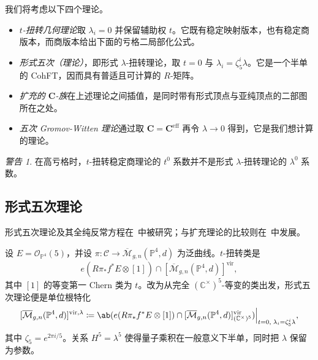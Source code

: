 \documentclass{amsart}
\theoremstyle{definition}
\theoremstyle{remark}
\newtheorem{warn}[thm]{警告}
\theoremstyle{plain}
\theoremstyle{definition}
\theoremstyle{remark}
\newcommand{\C}{\mathbb{C}}
\renewcommand{\P}{\mathbb{P}}
\newcommand{\Mbar}{\overline{\mathcal{M}}}
\newcommand{\mc}[1]{\mathcal{#1}}
\newcommand{\mbf}[1]{\mathbf{#1}}
\newcommand{\mr}[1]{\mathrm{#1}}
\newcommand{\1}{\mathbf{1}}
\newcommand{\2}{\mathbf{2}}
\newcommand{\3}{\mathbf{3}}
\newcommand{\vir}{\mr{vir}}
\begin{document}
我们将考虑以下四个理论。
\begin{itemize}
    \item \textit{\(t\)-扭转几何理论}取 \(\lambda_i = 0\) 并保留辅助权 \(t\)。它既有稳定映射版本，也有稳定商版本，而商版本给出下面的亏格二局部化公式。
    \item \textit{形式五次（理论）}，即形式 \(\lambda\)-扭转理论，取 \(t = 0\) 与 \(\lambda_i = \zeta_5^i \lambda\)。它是一个半单的 CohFT，因而具有普适且可计算的 \(R\)-矩阵。
    \item \textit{扩充的 \(\mbf{C}\)-族}在上述理论之间插值，是同时带有形式顶点与亚纯顶点的二部图所在之处。
    \item \textit{五次 Gromov-Witten 理论}通过取 \(\mbf{C} = \mbf{C}^{\mr{eff}}\) 再令 \(\lambda \to 0\) 得到，它是我们想计算的理论。
\end{itemize}

\begin{warn}
    在高亏格时，\(t\)-扭转稳定商理论的 \(t^0\) 系数并不是形式 \(\lambda\)-扭转理论的 \(\lambda^0\) 系数。
\end{warn}

\subsection{形式五次理论}%
\label{sub:The formal quintic}

形式五次理论及其全纯反常方程在~\cite{LhoPandharipande2019}中被研究；与扩充理论的比较则在~\cite{GJRstructure}中发展。

设 \(E = \mc{O}_{\P^4}(5)\)，并设 \(\pi \colon \mc{C} \to \Mbar_{g,n}(\P^4,d)\) 为泛曲线。\(t\)-扭转类是
\[ e(R\pi_* f^* E \otimes [1]) \cap [\Mbar_{g,n}(\P^4,d)]^{\vir}, \]
其中 \([1]\) 的等变第一 Chern 类为 \(t\)。改为从完全 \((\C^{\times})^5\)-等变的类出发，形式五次理论便是单位根特化
\[ [\Mbar_{g,n}(\P^4,d)]^{\vir,\lambda} \coloneqq \ab( e(R\pi_*f^*E \otimes [1]) \cap [\Mbar_{g,n}(\P^4,d)]^{\vir}_{(\C^{\times})^5})\Big|_{t=0, \; \lambda_i = \zeta_5^i \lambda}, \]
其中 \(\zeta_5 = e^{2\pi i/5}\)。关系 \(H^5 = \lambda^5\) 使得量子乘积在一般意义下半单，同时把 \(\lambda\) 保留为参数。
\end{document}
